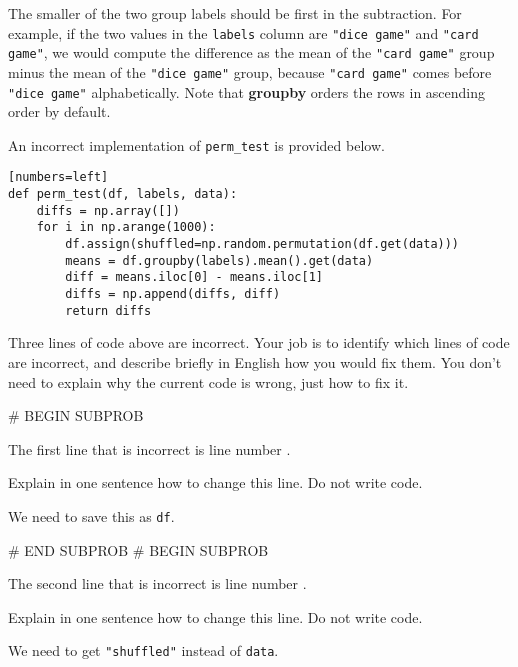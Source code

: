\documentclass[twoside,12pt]{article}
\begin{document}
{The smaller of the two group labels should be first in the subtraction. For example, if the two values in the \texttt{labels} column are \texttt{"dice game"} and \texttt{"card game"}, we would compute the difference as the mean of the \texttt{"card game"} group minus the mean of the \texttt{"dice game"} group, because \texttt{"card game"} comes before \texttt{"dice game"} alphabetically. Note that \textbf{groupby} orders the rows in ascending order by default.

        An incorrect implementation of \texttt{perm\_test} is provided below. 
    
\begin{verbatim}[numbers=left]
def perm_test(df, labels, data):
    diffs = np.array([])
    for i in np.arange(1000):
        df.assign(shuffled=np.random.permutation(df.get(data)))  
        means = df.groupby(labels).mean().get(data)
        diff = means.iloc[0] - means.iloc[1]
        diffs = np.append(diffs, diff)
        return diffs
\end{verbatim}

Three lines of code above are incorrect. Your job is to identify which lines of code are incorrect, and describe briefly in English how you would fix them. You don't need to explain why the current code is wrong, just how to fix it.

\newpage
    
        
            # BEGIN SUBPROB

    
                The first line that is incorrect is line number .
            
                Explain in one sentence how to change this line. Do not write code.
                \begin{responsebox}{1.5in}
                    We need to save this as \texttt{df}.
                \end{responsebox}
            

# END SUBPROB
            # BEGIN SUBPROB

    
                The second line that is incorrect is line number .
            
                Explain in one sentence how to change this line. Do not write code.
                \begin{responsebox}{1.5in}
                    We need to get \texttt{"shuffled"} instead of \texttt{data}.
                \end{responsebox}
            

}
\end{document}
